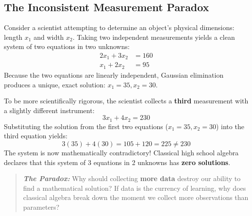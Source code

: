 \subsection{The Inconsistent Measurement Paradox}
Consider a scientist attempting to determine an object's physical dimensions: length $x_1$ and width $x_2$. Taking two independent measurements yields a clean system of two equations in two unknowns:
\begin{equation}
\begin{aligned}
2x_1 + 3x_2 &= 160 \\
x_1 + 2x_2 &= 95
\end{aligned}
\end{equation}
Because the two equations are linearly independent, Gaussian elimination produces a unique, exact solution: $x_1 = 35, x_2 = 30$.

To be more scientifically rigorous, the scientist collects a \textbf{third} measurement with a slightly different instrument:
\begin{equation}
3x_1 + 4x_2 = 230
\end{equation}
Substituting the solution from the first two equations ($x_1 = 35, x_2 = 30$) into the third equation yields:
\begin{equation}
3(35) + 4(30) = 105 + 120 = 225 \ne 230
\end{equation}
The system is now mathematically contradictory! Classical high school algebra declares that this system of 3 equations in 2 unknowns has \textbf{zero solutions}.

\begin{quote}
\textit{\textbf{The Paradox:}} Why should collecting \textbf{more data} destroy our ability to find a mathematical solution? If data is the currency of learning, why does classical algebra break down the moment we collect more observations than parameters?
\end{quote}

